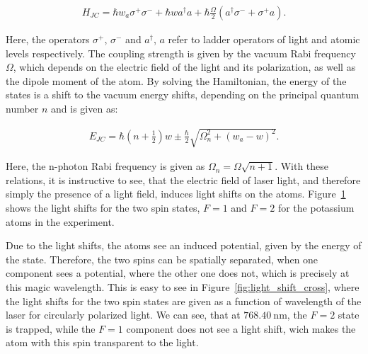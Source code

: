 \begin{align}
	H_{JC} = \hbar w_a \sigma^+ \sigma^- + \hbar w a^\dagger a + \hbar \frac{\Omega}{2}\left(a^\dagger \sigma^- + \sigma^+ a\right).
\end{align}

Here, the operators $\sigma^+$, $\sigma^-$ and $a^\dagger$, $a$ refer to ladder operators of light and atomic levels respectively. The coupling strength is given by the vacuum Rabi frequency $\Omega$, which depends on the electric field of the light and its polarization, as well as the dipole moment of the atom.
By solving the Hamiltonian, the energy of the states is a shift to the vacuum energy shifts, depending on the principal quantum number $n$ and is given as:

\begin{align}
	E_{JC} = \hbar \left(n + \frac{1}{2} \right) w \pm \frac{\hbar}{2} \sqrt{\Omega_n^2 + {\left(w_a - w\right)}^2}.
\end{align}

Here, the n-photon Rabi frequency is given as $\Omega_n = \Omega\sqrt{n+1}$. With these relations, it is instructive to see, that the electric field of laser light, and therefore simply the presence of a light field, induces light shifts on the atoms. Figure~\ref{fig:split_light_shift} shows the light shifts for the two spin states, $F=1$ and $F=2$ for the potassium atoms in the experiment.

\begin{figure}[t]%
\label{fig:split_light_shift}
\end{figure}

Due to the light shifts, the atoms see an induced potential, given by the energy of the state. Therefore, the two spins can be spatially separated, when one component sees a potential, where the other one does not, which is precisely at this magic wavelength. This is easy to see in Figure~\ref{fig:light_shift_cross}, where the light shifts for the two spin states are given as a function of wavelength of the laser for circularly polarized light. We can see, that at $\SI{768.40}{\nano\meter}$, the $F=2$ state is trapped, while the $F=1$ component does not see a light shift, wich makes the atom with this spin transparent to the light.

